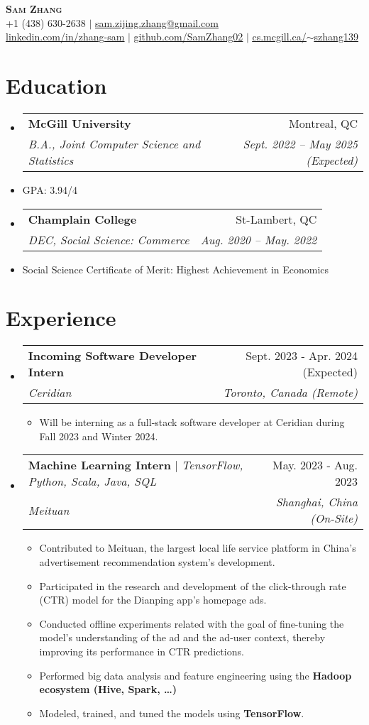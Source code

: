 \documentclass[letterpaper,11pt]{article}
\makeatletter
\newcommand{\resumeItem}[1]{
  \item\small{
    {#1 \vspace{-2pt}}
  }
}
\newcommand{\resumeSubheading}[4]{
  \vspace{-2pt}\item
  \begin{tabular*}{0.97\textwidth}[t]{l@{\extracolsep{\fill}}r}
    #1 & #2 \\
    \textit{\small#3} & \textit{\small #4} \\
  \end{tabular*}\vspace{-7pt}
}
\newcommand{\resumeSubHeadingListStart}{\begin{itemize}[leftmargin=0.15in, label={}]}
\newcommand{\resumeSubHeadingListEnd}{\end{itemize}}
\newcommand{\resumeItemListStart}{\begin{itemize}}
\newcommand{\resumeItemListEnd}{\end{itemize}\vspace{-5pt}}
\makeatother
\begin{document}
\begin{center}
  \textbf{\Huge \scshape Sam Zhang} \\ \vspace{1pt}
  \small +1 (438) 630-2638 $|$ \href{mailto:sam.zijing.zhang@gmail.com}{\underline{sam.zijing.zhang@gmail.com}}  \\
  \href{https://linkedin.com/in/zhang-sam}{\underline{linkedin.com/in/zhang-sam}} $|$
  \href{https://github.com/SamZhang02}{\underline{github.com/SamZhang02}} $|$
  \href{https://cs.mcgill.ca/~szhang139}{\underline{cs.mcgill.ca/$\sim$szhang139}}
\end{center}
\section{Education}
\resumeSubHeadingListStart
\resumeSubheading
{\textbf{McGill University}}{Montreal, QC}
{B.A., Joint Computer Science and Statistics}{ Sept. 2022 -- May 2025 (Expected)}
\resumeItem{GPA: 3.94/4}
\resumeSubheading
{\textbf{Champlain College}}{St-Lambert, QC}
{DEC, Social Science: Commerce}{Aug. 2020 -- May. 2022}
\resumeItem{Social Science Certificate of Merit: Highest Achievement in Economics}
\resumeSubHeadingListEnd

\section{Experience}
\resumeSubHeadingListStart

\resumeSubheading
{{\textbf{Incoming Software Developer Intern}} }{Sept. 2023 - Apr. 2024 (Expected)}
{Ceridian}{Toronto, Canada (Remote)}
\resumeItemListStart
\resumeItem{Will be interning as a full-stack software developer at Ceridian during Fall 2023 and Winter 2024.}
\resumeItemListEnd
\resumeSubheading
{{\textbf{Machine Learning Intern}} $|$ \emph{TensorFlow, Python, Scala, Java, SQL}}{May. 2023 - Aug. 2023}
{Meituan}{Shanghai, China (On-Site)}
\resumeItemListStart
\resumeItem{Contributed to Meituan, the largest local life service platform in China's advertisement recommendation system's development.}
\resumeItem{Participated in the research and development of the click-through rate (CTR) model for the Dianping app's homepage ads.}
\resumeItem{Conducted offline experiments related with the goal of fine-tuning the model's understanding of the ad and the ad-user context, thereby improving its performance in CTR predictions.}
\resumeItem{Performed big data analysis and feature engineering using the \textbf{Hadoop ecosystem (Hive, Spark, \ldots)}}
\resumeItem{Modeled, trained, and tuned the models using \textbf{TensorFlow}.}
\resumeItemListEnd
\resumeSubHeadingListEnd
\end{document}
